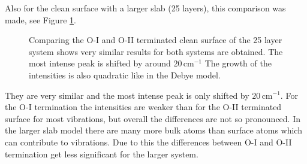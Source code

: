 \documentclass[11pt,DIV=13,BCOR=5mm,a4paper,headinclude]{scrbook}
\begin{document}
Also for the clean surface with a larger slab (25 layers), this comparison was made, see Figure \ref{abb:comp_O-I-O-II_25}.
\begin{figure}[!h]
 \centering
 \caption{Comparing the O-I and O-II terminated clean surface of the 25 layer system shows very similar results for both systems are obtained.
The most intense peak is shifted by around $20\,$cm$^{-1}$
The growth of the intensities is also quadratic like in the Debye model.}
 \label{abb:comp_O-I-O-II_25}
\end{figure}
They are very similar and the most intense peak is only shifted by $20\,$cm$^{-1}$.
For the O-I termination the intensities are weaker than for the O-II terminated surface for most vibrations, but overall the differences are not so pronounced.
In the larger slab model there are many more bulk atoms than surface atoms which can contribute to vibrations.
Due to this the differences between O-I and O-II termination get less significant for the larger system.

\end{document}
